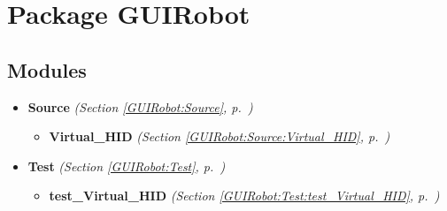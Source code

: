 %
%
%


\section{Package GUIRobot}

    \label{GUIRobot}


\subsection{Modules}

\begin{itemize}
\setlength{\parskip}{0ex}
\item \textbf{Source}
  \textit{(Section \ref{GUIRobot:Source}, p.~\pageref{GUIRobot:Source})}

  \begin{itemize}
\setlength{\parskip}{0ex}
    \item \textbf{Virtual\_HID}
  \textit{(Section \ref{GUIRobot:Source:Virtual_HID}, p.~\pageref{GUIRobot:Source:Virtual_HID})}

  \end{itemize}
\item \textbf{Test}
  \textit{(Section \ref{GUIRobot:Test}, p.~\pageref{GUIRobot:Test})}

  \begin{itemize}
\setlength{\parskip}{0ex}
    \item \textbf{test\_Virtual\_HID}
  \textit{(Section \ref{GUIRobot:Test:test_Virtual_HID}, p.~\pageref{GUIRobot:Test:test_Virtual_HID})}

  \end{itemize}
\end{itemize}




